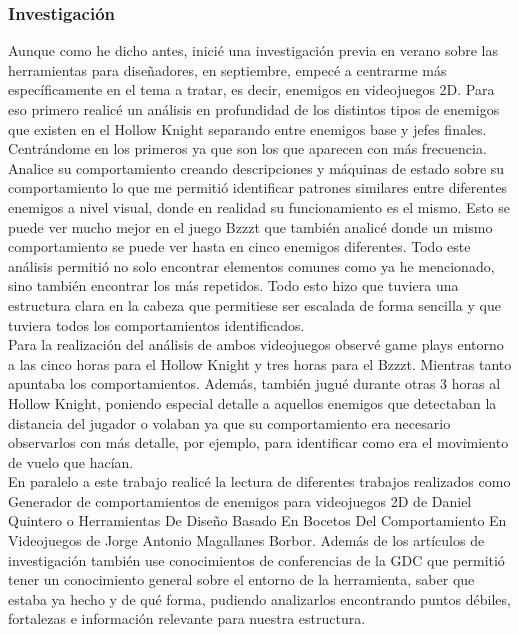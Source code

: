 \subsubsection{Investigación}
Aunque como he dicho antes, inicié una investigación previa en verano sobre las herramientas para diseñadores, en septiembre, empecé a centrarme más específicamente en el tema a tratar, es decir, enemigos en videojuegos 2D. Para eso primero realicé un análisis en profundidad de los distintos tipos de enemigos que existen en el Hollow Knight separando entre enemigos base y jefes finales. Centrándome en los primeros ya que son los que aparecen con más frecuencia. Analice su comportamiento creando descripciones y máquinas de estado sobre su comportamiento lo que me permitió identificar patrones similares entre diferentes enemigos a nivel visual, donde en realidad su funcionamiento es el mismo. Esto se puede ver mucho mejor en el juego Bzzzt que también analicé donde un mismo comportamiento se puede ver hasta en cinco enemigos diferentes. Todo este análisis permitió no solo encontrar elementos comunes como ya he mencionado, sino también encontrar los más repetidos.
Todo esto hizo que tuviera una estructura clara en la cabeza que permitiese ser escalada de forma sencilla y que tuviera todos los comportamientos identificados. \\
Para la realización del análisis de ambos videojuegos observé game plays entorno a las cinco horas para el Hollow Knight y tres horas para el Bzzzt. Mientras tanto apuntaba los comportamientos. Además, también jugué durante otras 3 horas al Hollow Knight, poniendo especial detalle a aquellos enemigos que detectaban la distancia del jugador o volaban ya que su comportamiento era necesario observarlos con más detalle, por ejemplo, para identificar como era el movimiento de vuelo que hacían.\\

En paralelo a este trabajo realicé la lectura de diferentes trabajos realizados como Generador de comportamientos de enemigos para videojuegos 2D de Daniel Quintero o Herramientas De Diseño Basado En Bocetos Del Comportamiento En Videojuegos de Jorge Antonio Magallanes Borbor. Además de los artículos de investigación también use conocimientos de conferencias de la GDC que permitió tener un conocimiento general sobre el  entorno de la herramienta, saber que estaba ya hecho y de qué forma, pudiendo analizarlos encontrando puntos débiles, fortalezas e información relevante para nuestra estructura.

